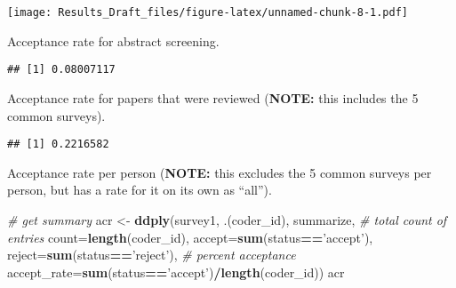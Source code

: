 \documentclass[
]{article}
\newenvironment{Shaded}{\begin{snugshade}}{\end{snugshade}}
\newcommand{\CommentTok}[1]{\textcolor[rgb]{0.56,0.35,0.01}{\textit{#1}}}
\newcommand{\DataTypeTok}[1]{\textcolor[rgb]{0.13,0.29,0.53}{#1}}
\newcommand{\KeywordTok}[1]{\textcolor[rgb]{0.13,0.29,0.53}{\textbf{#1}}}
\newcommand{\NormalTok}[1]{#1}
\newcommand{\OperatorTok}[1]{\textcolor[rgb]{0.81,0.36,0.00}{\textbf{#1}}}
\newcommand{\StringTok}[1]{\textcolor[rgb]{0.31,0.60,0.02}{#1}}
\begin{document}
\texttt{[image: Results\_Draft\_files/figure-latex/unnamed-chunk-8-1.pdf]}

Acceptance rate for abstract screening.

\begin{Shaded}
\end{Shaded}

\begin{verbatim}
## [1] 0.08007117
\end{verbatim}

Acceptance rate for papers that were reviewed (\textbf{NOTE:} this
includes the 5 common surveys).

\begin{Shaded}
\end{Shaded}

\begin{verbatim}
## [1] 0.2216582
\end{verbatim}

Acceptance rate per person (\textbf{NOTE:} this excludes the 5 common
surveys per person, but has a rate for it on its own as ``all'').

\begin{Shaded}
\begin{Highlighting}[]
\CommentTok{# get summary}
\NormalTok{  acr <-}\StringTok{ }\KeywordTok{ddply}\NormalTok{(survey1, .(coder_id), summarize,}
              \CommentTok{# total count of entries     }
              \DataTypeTok{count=}\KeywordTok{length}\NormalTok{(coder_id),}
              \DataTypeTok{accept=}\KeywordTok{sum}\NormalTok{(status}\OperatorTok{==}\StringTok{'accept'}\NormalTok{),}
              \DataTypeTok{reject=}\KeywordTok{sum}\NormalTok{(status}\OperatorTok{==}\StringTok{'reject'}\NormalTok{),}
              \CommentTok{# percent acceptance}
              \DataTypeTok{accept_rate=}\KeywordTok{sum}\NormalTok{(status}\OperatorTok{==}\StringTok{'accept'}\NormalTok{)}\OperatorTok{/}\KeywordTok{length}\NormalTok{(coder_id))}
\NormalTok{  acr}
\end{Highlighting}
\end{Shaded}
\end{document}
